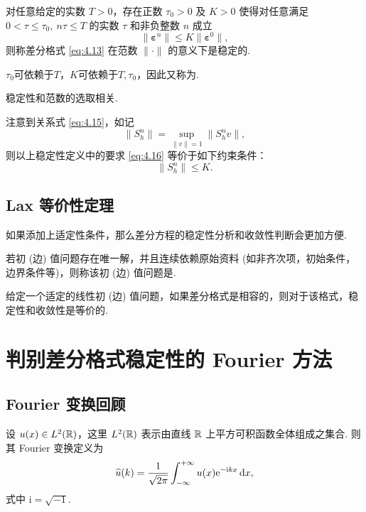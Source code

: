 \begin{definition}[稳定性]
    对任意给定的实数 $T > 0$，存在正数 $\tau_0 > 0$ 及 $K > 0$ 使得对任意满足 $0 < \tau \leq \tau_0, \ n\tau \leq T$ 的实数 $\tau$ 和非负整数 $n$ 成立
    \begin{equation}
        \|\bm{\varepsilon}^n\| \leq K \|\bm{\varepsilon}^0\|, \label{eq:4.16}
    \end{equation}
    则称差分格式 \eqref{eq:4.13} 在范数 $\| \cdot \|$ 的意义下是稳定的.
\end{definition}
\begin{remark}
    $\tau_0$可依赖于$T$，$K$可依赖于$T,\tau_0$，因此又称为.\par
    稳定性和范数的选取相关.
\end{remark}
注意到关系式 \eqref{eq:4.15}，如记
\[ \|S_h^n\| = \sup_{\|v\|=1} \|S_h^n v\|, \]
则以上稳定性定义中的要求 \eqref{eq:4.16} 等价于如下约束条件：
\[ \|S_h^n\| \leq K. \]

\subsection*{Lax 等价性定理}如果添加上适定性条件，那么差分方程的稳定性分析和收敛性判断会更加方便.

\begin{definition}[适定性]
    若初 (边) 值问题存在唯一解，并且连续依赖原始资料 (如非齐次项，初始条件，边界条件等)，则称该初 (边) 值问题是.
\end{definition}

\begin{theorem}
    给定一个适定的线性初 (边) 值问题，如果差分格式是相容的，则对于该格式，稳定性和收敛性是等价的.
\end{theorem}

\section{判别差分格式稳定性的 Fourier 方法}

\subsection{Fourier 变换回顾}

设 $u(x) \in L^2(\mathbb{R})$，这里 $L^2(\mathbb{R})$ 表示由直线 $\mathbb{R}$ 上平方可积函数全体组成之集合. 则其 Fourier 变换定义为
\begin{equation*}
    \widehat{u}(k) = \frac{1}{\sqrt{2\pi}} \int_{-\infty}^{+\infty} u(x) \mathrm{e}^{-\mathrm{i}kx} \mathop{}\!\mathrm{d} x, 
\end{equation*}
式中 $\mathrm{i} = \sqrt{-1}$.

